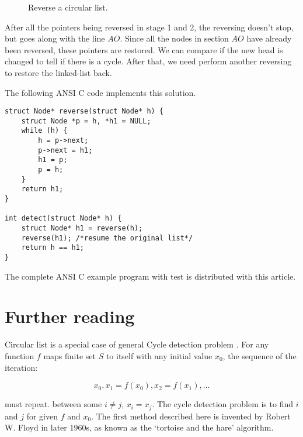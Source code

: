 \documentclass{article}
\begin{document}
\begin{figure}[htdp]
{
}
\caption{Reverse a circular list.}
\label{fig:reverse}
\end{figure}

After all the pointers being reversed in stage 1 and 2, the reversing doesn't
stop, but goes along with the line $AO$. Since all the nodes in section $AO$
have already been reversed, these pointers are restored. We can compare if
the new head is changed to tell if there is a cycle. After that, we need
perform another reversing to restore the linked-list back.

The following ANSI C code implements this solution.

\lstset{language=C}
\begin{lstlisting}
struct Node* reverse(struct Node* h) {
    struct Node *p = h, *h1 = NULL;
    while (h) {
        h = p->next;
        p->next = h1;
        h1 = p;
        p = h;
    }
    return h1;
}

int detect(struct Node* h) {
    struct Node* h1 = reverse(h);
    reverse(h1); /*resume the original list*/
    return h == h1;
}
\end{lstlisting}


The complete ANSI C example program with test is distributed with this article.

\section*{Further reading}
Circular list is a special case of general Cycle detection problem \cite{wiki-cycle-detection}.
For any function $f$ maps finite set $S$ to itself with any initial value $x_0$, the sequence of the
iteration:

\[
x_0, x_1 = f(x_0), x_2 = f(x_1), ...
\]

must repeat. between some $i \neq j$, $x_i = x_j$. The cycle detection problem is to find $i$ and $j$ for
given $f$ and $x_0$. The first method described here is invented by Robert W. Floyd in later 1960s, as known
as the `tortoise and the hare' algorithm.
\end{document}
